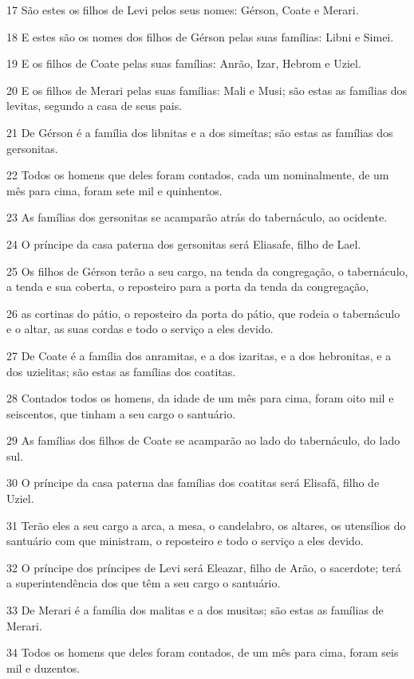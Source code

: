 \par 17 São estes os filhos de Levi pelos seus nomes: Gérson, Coate e Merari.
\par 18 E estes são os nomes dos filhos de Gérson pelas suas famílias: Libni e Simei.
\par 19 E os filhos de Coate pelas suas famílias: Anrão, Izar, Hebrom e Uziel.
\par 20 E os filhos de Merari pelas suas famílias: Mali e Musi; são estas as famílias dos levitas, segundo a casa de seus pais.
\par 21 De Gérson é a família dos libnitas e a dos simeítas; são estas as famílias dos gersonitas.
\par 22 Todos os homens que deles foram contados, cada um nominalmente, de um mês para cima, foram sete mil e quinhentos.
\par 23 As famílias dos gersonitas se acamparão atrás do tabernáculo, ao ocidente.
\par 24 O príncipe da casa paterna dos gersonitas será Eliasafe, filho de Lael.
\par 25 Os filhos de Gérson terão a seu cargo, na tenda da congregação, o tabernáculo, a tenda e sua coberta, o reposteiro para a porta da tenda da congregação,
\par 26 as cortinas do pátio, o reposteiro da porta do pátio, que rodeia o tabernáculo e o altar, as suas cordas e todo o serviço a eles devido.
\par 27 De Coate é a família dos anramitas, e a dos izaritas, e a dos hebronitas, e a dos uzielitas; são estas as famílias dos coatitas.
\par 28 Contados todos os homens, da idade de um mês para cima, foram oito mil e seiscentos, que tinham a seu cargo o santuário.
\par 29 As famílias dos filhos de Coate se acamparão ao lado do tabernáculo, do lado sul.
\par 30 O príncipe da casa paterna das famílias dos coatitas será Elisafã, filho de Uziel.
\par 31 Terão eles a seu cargo a arca, a mesa, o candelabro, os altares, os utensílios do santuário com que ministram, o reposteiro e todo o serviço a eles devido.
\par 32 O príncipe dos príncipes de Levi será Eleazar, filho de Arão, o sacerdote; terá a superintendência dos que têm a seu cargo o santuário.
\par 33 De Merari é a família dos malitas e a dos musitas; são estas as famílias de Merari.
\par 34 Todos os homens que deles foram contados, de um mês para cima, foram seis mil e duzentos.
